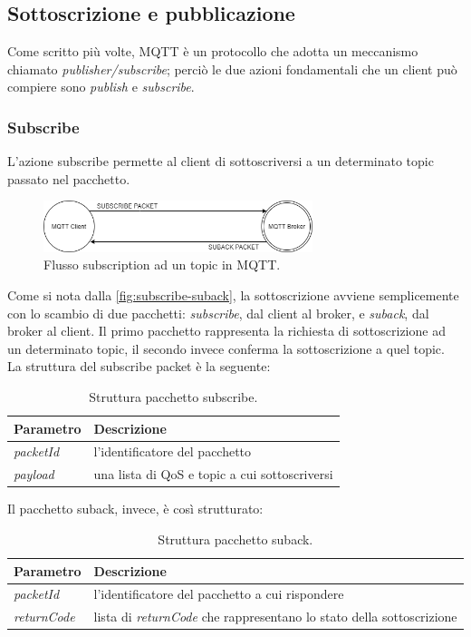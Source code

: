 \documentclass[binding=0.6cm,TFA]{sapthesis}
\begin{document}
\begin{large}
\subsection{Sottoscrizione e pubblicazione}
Come scritto più volte, MQTT è un protocollo che adotta un meccanismo chiamato \textit{publisher/subscribe}; perciò le due azioni fondamentali che un client può compiere sono \textit{publish} e \textit{subscribe}.
\subsubsection{Subscribe}
L'azione subscribe permette al client di sottoscriversi a un determinato topic passato nel pacchetto.

\begin{figure}[h]
\centering
\includegraphics[width=0.7\textwidth]{images/subscribe-suback.png}
\caption{Flusso subscription ad un topic in MQTT.}
\label{fig:subscribe-suback}
\end{figure}

Come si nota dalla \autoref{fig:subscribe-suback}, la sottoscrizione avviene semplicemente con lo scambio di due pacchetti: \textit{subscribe}, dal client al broker, e \textit{suback}, dal broker al client. Il primo pacchetto rappresenta la richiesta di sottoscrizione ad un determinato topic, il secondo invece conferma la sottoscrizione a quel topic. \\
La struttura del subscribe packet è la seguente:

\begin{table}[h]
\caption{Struttura pacchetto subscribe.}
\label{tab:subscribe}
\begin{tabular}{lp{}}
\toprule
\textbf{Parametro} & \textbf{Descrizione} \\
\midrule
\textit{packetId} & l'identificatore del pacchetto \\
\textit{payload} & una lista di QoS e topic a cui sottoscriversi \\
\bottomrule
\end{tabular}
\end{table}
Il pacchetto suback, invece, è così strutturato:
\begin{table}[h]
\caption{Struttura pacchetto suback.}
\label{tab:suback}
\begin{tabular}{lp{}}
\toprule
\textbf{Parametro} & \textbf{Descrizione} \\
\midrule
\textit{packetId} & l'identificatore del pacchetto a cui rispondere \\
\textit{returnCode} & lista di \textit{returnCode} che rappresentano lo stato della sottoscrizione \\
\bottomrule
\end{tabular}
\end{table}


\end{large}
\end{document}
